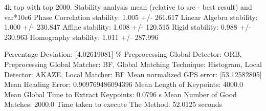 4k top with top 2000. 
Stability analysis mean (relative to src - best result) and var*10e6
Phase Correlation stability: 1.005 +/- 261.617
Linear Algebra stability: 1.000 +/- 230.847
Affine stability: 1.008 +/- 120.515
Rigid stability: 0.988 +/- 230.963
Homography stability: 1.011 +/- 287.996

Percentage Deviation: [4.02619081] \%
Preprocessing Global Detector: ORB, Preprocessing Global Matcher: BF, Global Matching Technique: Histogram, Local Detector: AKAZE, Local Matcher: BF
Mean normalized GPS error: [53.12582805]
 Mean Heading Error: 0.909769486094396
Mean Length of Keypoints: 4000.0
Mean Global Time to Extract Keypoints: 0.0796 s
Mean Number of Good Matches: 2000.0
Time taken to execute The Method: 52.0125 seconds

